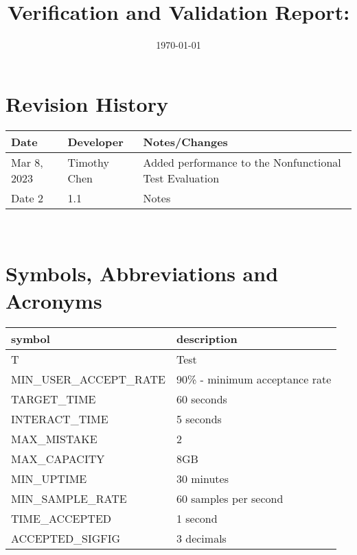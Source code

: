\documentclass[12pt, titlepage]{article}
\begin{document}
\title{Verification and Validation Report: \progname} 
\author{\authname}
\date{\today}
	
\maketitle


\section{Revision History}

\begin{tabularx}{\textwidth}{p{2.5cm}p{3cm}X}
\toprule {\bf Date} & {\bf Developer} & {\bf Notes/Changes}\\
\midrule
Mar 8, 2023 & Timothy Chen & Added performance to the Nonfunctional Test Evaluation\\
Date 2 & 1.1 & Notes\\
\bottomrule
\end{tabularx}

~\newpage

\section{Symbols, Abbreviations and Acronyms}

\renewcommand{\arraystretch}{1.2}
\begin{tabular}{l l} 
  \toprule		
  \textbf{symbol} & \textbf{description}\\
  \midrule 
  T & Test\\
  MIN\_USER\_ACCEPT\_RATE & 90\% - minimum acceptance rate\\
  TARGET\_TIME & 60 seconds \\
  INTERACT\_TIME & 5 seconds \\
  MAX\_MISTAKE & 2 \\
  MAX\_CAPACITY & 8GB \\ 
  MIN\_UPTIME & 30 minutes \\ 
  MIN\_SAMPLE\_RATE & 60 samples per second\\
  TIME\_ACCEPTED & 1 second \\
  ACCEPTED\_SIGFIG & 3 decimals \\
  \bottomrule
\end{tabular}\\

\end{document}
